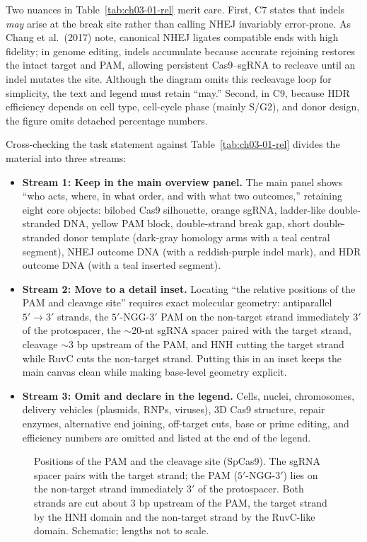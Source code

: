 Two nuances in Table~\ref{tab:ch03-01-rel} merit care. First, C7 states that indels \emph{may} arise at the break site rather than calling NHEJ invariably error-prone. As Chang et al.\ (2017) note, canonical NHEJ ligates compatible ends with high fidelity; in genome editing, indels accumulate because accurate rejoining restores the intact target and PAM, allowing persistent Cas9--sgRNA to recleave until an indel mutates the site. Although the diagram omits this recleavage loop for simplicity, the text and legend must retain ``may.'' Second, in C9, because HDR efficiency depends on cell type, cell-cycle phase (mainly S/G2), and donor design, the figure omits detached percentage numbers.

Cross-checking the task statement against Table~\ref{tab:ch03-01-rel} divides the material into three streams:

\begin{itemize}
\item \textbf{Stream 1: Keep in the main overview panel.} The main panel shows ``who acts, where, in what order, and with what two outcomes,'' retaining eight core objects: bilobed Cas9 silhouette, orange sgRNA, ladder-like double-stranded DNA, yellow PAM block, double-strand break gap, short double-stranded donor template (dark-gray homology arms with a teal central segment), NHEJ outcome DNA (with a reddish-purple indel mark), and HDR outcome DNA (with a teal inserted segment).
\item \textbf{Stream 2: Move to a detail inset.} Locating ``the relative positions of the PAM and cleavage site'' requires exact molecular geometry: antiparallel $5'\rightarrow 3'$ strands, the $5'$-NGG-$3'$ PAM on the non-target strand immediately $3'$ of the protospacer, the $\sim$20-nt sgRNA spacer paired with the target strand, cleavage $\sim$3 bp upstream of the PAM, and HNH cutting the target strand while RuvC cuts the non-target strand. Putting this in an inset keeps the main canvas clean while making base-level geometry explicit.
\item \textbf{Stream 3: Omit and declare in the legend.} Cells, nuclei, chromosomes, delivery vehicles (plasmids, RNPs, viruses), 3D Cas9 structure, repair enzymes, alternative end joining, off-target cuts, base or prime editing, and efficiency numbers are omitted and listed at the end of the legend.
\end{itemize}

\begin{figure}[htbp]\centering

\caption{Positions of the PAM and the cleavage site (SpCas9). The sgRNA spacer pairs with the target strand; the PAM ($5'$-NGG-$3'$) lies on the non-target strand immediately $3'$ of the protospacer. Both strands are cut about 3 bp upstream of the PAM, the target strand by the HNH domain and the non-target strand by the RuvC-like domain. Schematic; lengths not to scale.}\label{fig:ch03-07}
\end{figure}

